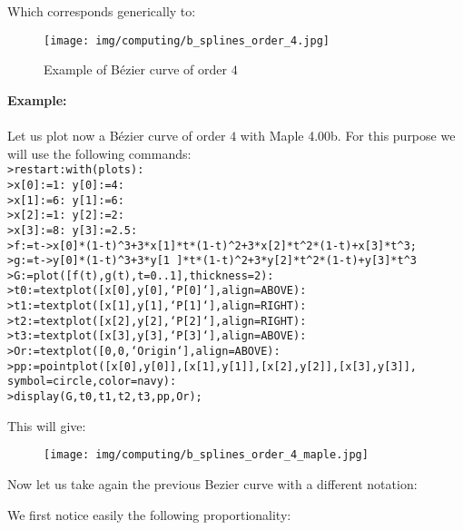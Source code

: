 	Which corresponds generically to:
	\begin{figure}[H]
		\centering
		\texttt{[image: img/computing/b\_splines\_order\_4.jpg]}
		\caption{Example of Bézier curve of order $4$}
	\end{figure}
	\pagebreak
	\begin{tcolorbox}[colframe=black,colback=white,sharp corners]
	\textbf{{\Large {}}Example:}\\\\
	Let us plot now a Bézier curve of order $4$ with Maple 4.00b. For this purpose we will use the following commands:\\
	
	\texttt{>restart:with(plots):\\
	>x[0]:=1: y[0]:=4:\\
	>x[1]:=6: y[1]:=6:\\
	>x[2]:=1: y[2]:=2:\\
	>x[3]:=8: y[3]:=2.5:\\
	>f:=t->x[0]*(1-t)\string^3+3*x[1]*t*(1-t)\string^2+3*x[2]*t\string^2*(1-t)+x[3]*t\string^3;\\
	>g:=t->y[0]*(1-t)\string^3+3*y[1 ]*t*(1-t)\string^2+3*y[2]*t\string^2*(1-t)+y[3]*t\string^3\\
	>G:=plot([f(t),g(t),t=0..1],thickness=2):\\
	>t0:=textplot([x[0],y[0],`P[0]`],align=ABOVE):\\	
	>t1:=textplot([x[1],y[1],`P[1]`],align=RIGHT):\\	
	>t2:=textplot([x[2],y[2],`P[2]`],align=RIGHT):\\
	>t3:=textplot([x[3],y[3],`P[3]`],align=ABOVE):\\
	>Or:=textplot([0,0,`Origin`],align=ABOVE):\\
	>pp:=pointplot({[x[0],y[0]],[x[1],y[1]],[x[2],y[2]],[x[3],y[3]]},\\
	symbol=circle,color=navy):\\
	>display(G,t0,t1,t2,t3,pp,Or);\\}
	
	This will give:
	\begin{figure}[H]
		\centering
		\texttt{[image: img/computing/b\_splines\_order\_4\_maple.jpg]}
	\end{figure}
	\end{tcolorbox}
	Now let us take again the previous Bezier curve with a different notation:
	
	We first notice easily the following proportionality:
	
